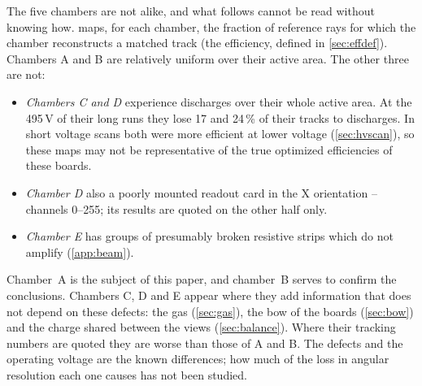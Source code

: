 The five chambers are not alike, and what follows cannot be read without knowing how.  maps, for each
chamber, the fraction of reference rays for which the chamber reconstructs a matched track (the efficiency, defined in
\cref{sec:effdef}). Chambers A and B are relatively uniform over their active area. The other three are not:
\begin{itemize}
  \item \emph{Chambers C and D} experience discharges over their whole active area. At the 495\,V of their long runs they lose 17 and 24\,\% of their tracks to discharges. In short voltage scans both were more efficient at lower voltage (\cref{sec:hvscan}), so these maps may not be representative of the true optimized efficiencies of these boards.
  \item \emph{Chamber D} also a poorly mounted readout card in the X orientation -- channels 0--255; its results are quoted on the other half only.
  \item \emph{Chamber E} has groups of presumably broken resistive strips which do not amplify (\cref{app:beam}).
\end{itemize}
Chamber~A is the subject of this paper, and chamber~B serves to confirm the conclusions. Chambers C, D and E appear where they add
information that does not depend on these defects: the gas (\cref{sec:gas}), the bow of the boards (\cref{sec:bow}) and the charge shared between the views (\cref{sec:balance}). Where their tracking numbers are quoted they are worse
than those of A and B. The defects and the operating voltage are the known differences; how much of the loss in
angular resolution each one causes has not been studied.

